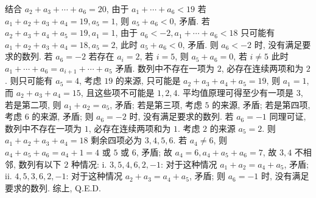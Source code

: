 \begin{solutions}
结合 $a_2+a_3+\cdots+a_6=20$, 由于 $a_1+\cdots+a_6 < 19$
若 $a_1+a_2+a_3+a_4=19, a_5=1$, 则 $a_5+a_6 < 0$, 矛盾.
若 $a_2+a_3+a_4+a_5=19, a_1=1$, 由于 $a_6 < -2, a_1+\cdots+a_6 < 18$
只可能有 $a_1+a_2+a_3+a_4=18, a_5=2$, 此时 $a_5+a_6 < 0$, 矛盾.
则 $a_6 < -2$ 时, 没有满足要求的数列.
 若 $a_6=-2$
若存在 $a_i=2$, 若 $i=5$, 则 $a_5+a_6=0$,
若 $i \neq 5$ 此时 $a_1+\cdots+a_6=a_{i+1}+\cdots+a_5$ 矛盾.
数列中不存在一项为 $2$, 必存在连续两项和为 $2$.
则只可能有 $a_5=4$,
考虑 $19$ 的来源, 只可能是 $a_2+a_3+a_4+a_5=19$,
则 $a_1=1$,
而 $a_2+a_3+a_4=15$, 且这些项不可能是 $1, 2, 4$.
平均值原理可得至少有一项是 $3$,
若是第二项, 则 $a_1+a_2=a_5$, 矛盾;
若是第三项, 考虑 $5$ 的来源, 矛盾;
若是第四项, 考虑 $6$ 的来源, 矛盾;
则 $a_6=-2$ 时, 没有满足要求的数列.
 若 $a_6=-1$
同理可证, 数列中不存在一项为 $1$, 必存在连续两项和为 $1$.
考虑 $2$ 的来源 $a_5=2$.
则 $a_1+a_2+a_3+a_4=18$
剩余四项必为 $3, 4, 5, 6$.
若 $a_4 \neq 6$, 则 $a_4+a_5+a_6=a_4+1=4$ 或 $5$ 或 $6$, 矛盾;
故 $a_4=6, a_4+a_5+a_6=7$, 故 $3, 4$ 不相邻, 数列有以下 $2$ 种情况:
i. $3, 5, 4, 6, 2, -1$: 对于这种情况 $a_1+a_2=a_4+a_5$, 矛盾;
ii. $4, 5, 3, 6, 2, -1$: 对于这种情况 $a_2+a_3=a_4+a_5$, 矛盾;
则 $a_6=-1$ 时, 没有满足要求的数列.
综上, Q.E.D.
\end{solutions}